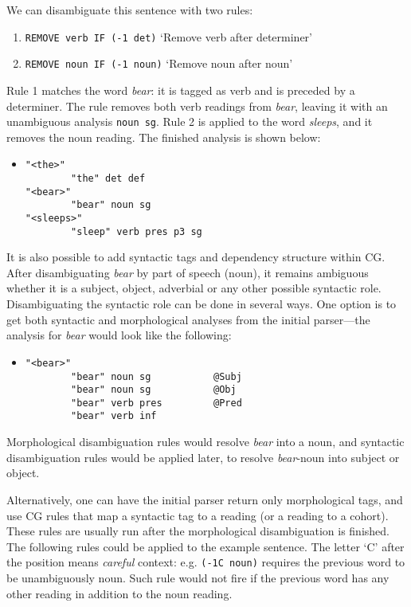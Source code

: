 \noindent We can disambiguate this sentence with two rules:

\begin{enumerate}
\def\labelenumi{\arabic{enumi}.}
\itemsep1pt\parskip0pt
\item \texttt{REMOVE verb IF (-1 det)}
  `Remove verb after determiner'
\item  \texttt{REMOVE noun IF (-1 noun)}
  `Remove noun after noun'
\end{enumerate}

\noindent Rule 1 matches the word \emph{bear}: it is tagged as verb and is
preceded by a determiner. The rule removes both verb readings from
\emph{bear}, leaving it with an unambiguous analysis \texttt{noun sg}.
Rule 2 is applied to the word \emph{sleeps}, and it removes the noun
reading. The finished analysis is shown below:

\begin{itemize}
\item[] \begin{verbatim}
"<the>"
        "the" det def
"<bear>"
        "bear" noun sg
"<sleeps>"
        "sleep" verb pres p3 sg
\end{verbatim}
\end{itemize}

It is also possible to add syntactic tags and dependency structure within CG. 
After disambiguating \emph{bear} by part of speech (noun), it
remains ambiguous whether it is a subject, object, adverbial or
any other possible syntactic role.
Disambiguating the syntactic role can be done in several ways. One option is to get both
syntactic and morphological analyses from the initial parser---the analysis
for \emph{bear} would look like the following:

\begin{itemize}
\item[] \begin{verbatim}
"<bear>"
        "bear" noun sg           @Subj
        "bear" noun sg           @Obj
        "bear" verb pres         @Pred
        "bear" verb inf 
\end{verbatim}
\end{itemize}

\noindent Morphological disambiguation rules would
resolve \emph{bear} into a noun, and syntactic disambiguation rules
would be applied later, to resolve \emph{bear}-noun into subject or object.

Alternatively, one can have the initial parser return only
morphological tags, and use CG rules that map a syntactic tag to a
reading (or a reading to a cohort).
These rules are usually run after the morphological disambiguation is
finished.
The following rules could be applied to the example sentence. The
letter `C' after the position means \emph{careful} context: e.g. 
\texttt{(-1C noun)} requires the previous word to be unambiguously
noun. Such rule would not fire if the previous word has any other
reading in addition to the noun reading.

